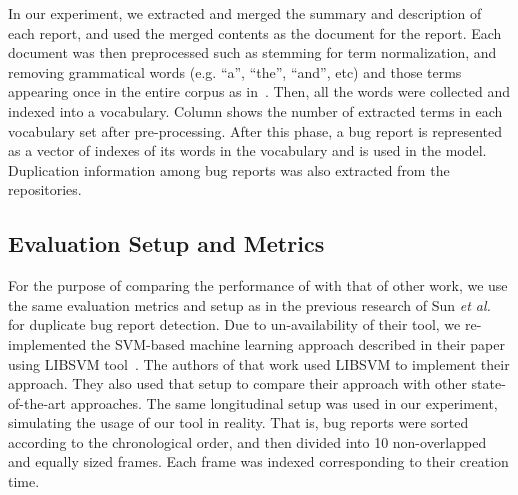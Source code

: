 In our experiment, we extracted and merged the summary and description
of each report, and used the merged contents as the document for the
report. Each document was then preprocessed such as stemming for term
normalization, and removing grammatical words (e.g. ``a'', ``the'',
``and'', etc) and those terms appearing once in the entire corpus as
in~\cite{RTM}.
Then, all the words were collected and indexed into a vocabulary.
Column  shows the number of extracted terms in each
vocabulary set after pre-processing. After this phase, a bug report is
represented as a vector of indexes of its words in the vocabulary and
is used in the model. Duplication information among bug reports was
also extracted from the repositories.



\subsection{Evaluation Setup and Metrics}

For the purpose of comparing the performance of {\model} with that of
other work, we use the same evaluation metrics and setup as in the
previous research of Sun {\em et al.}~\cite{davidlo10} for duplicate
bug report detection. Due to un-availability of their tool, we
re-implemented the SVM-based machine learning approach described in
their paper~\cite{davidlo10} using LIBSVM tool~\cite{libsvm}. The
authors of that work used LIBSVM to implement their approach. They
also used that setup to compare their approach with other
state-of-the-art approaches. The same longitudinal setup was used in
our experiment, simulating the usage of our {\model} tool in
reality. That is, bug reports were sorted according to the
chronological order, and then divided into 10 non-overlapped and
equally sized frames. Each frame was indexed corresponding to their
creation time.

